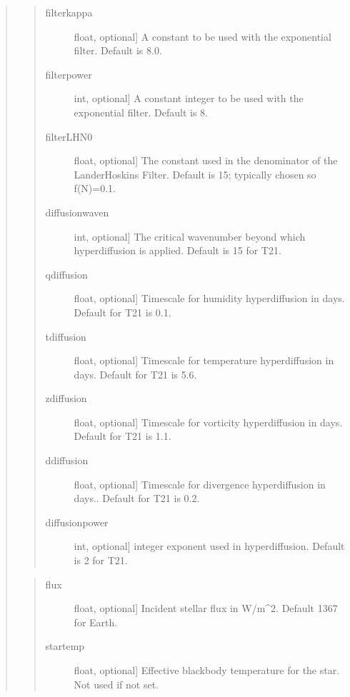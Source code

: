 \documentclass[letterpaper,10pt,english]{sphinxmanual}
\begin{document}
\begin{fulllineitems}
\begin{fulllineitems}
\begin{quote}
\begin{quote}
\begin{description}
\item[{filterkappa}] \leavevmode{[}float, optional{]}
A constant to be used with the exponential filter. Default is 8.0.

\item[{filterpower}] \leavevmode{[}int, optional{]}
A constant integer to be used with the exponential filter. Default is 8.

\item[{filterLHN0}] \leavevmode{[}float, optional{]}
The constant used in the denominator of the Lander\sphinxhyphen{}Hoskins Filter. Default
is 15; typically chosen so f(N)=0.1.

\item[{diffusionwaven}] \leavevmode{[}int, optional{]}
The critical wavenumber beyond which hyperdiffusion is applied. Default
is 15 for T21.

\item[{qdiffusion}] \leavevmode{[}float, optional{]}
Timescale for humidity hyperdiffusion in days. Default for T21 is 0.1.

\item[{tdiffusion}] \leavevmode{[}float, optional{]}
Timescale for temperature hyperdiffusion in days. Default for T21 is 5.6.

\item[{zdiffusion}] \leavevmode{[}float, optional{]}
Timescale for vorticity hyperdiffusion in days. Default for T21 is 1.1.

\item[{ddiffusion}] \leavevmode{[}float, optional{]}
Timescale for divergence hyperdiffusion in days.. Default for T21 is 0.2.

\item[{diffusionpower}] \leavevmode{[}int, optional{]}
integer exponent used in hyperdiffusion. Default is 2 for T21.

\end{description}
\end{quote}

\begin{quote}
\begin{description}
\item[{flux}] \leavevmode{[}float, optional{]}
Incident stellar flux in W/m\textasciicircum{}2. Default 1367 for Earth.

\item[{startemp}] \leavevmode{[}float, optional{]}
Effective blackbody temperature for the star. Not used if not set.


\end{description}
\end{quote}
\end{quote}
\end{fulllineitems}
\end{fulllineitems}
\end{document}
